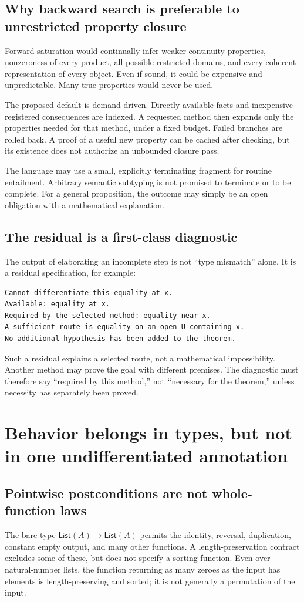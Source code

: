 \documentclass[11pt,a4paper]{article}
\theoremstyle{definition}
\begin{document}
\subsection{Why backward search is preferable to unrestricted property closure}
Forward saturation would continually infer weaker continuity properties,
nonzeroness of every product, all possible restricted domains, and every
coherent representation of every object. Even if sound, it could be expensive
and unpredictable. Many true properties would never be used.

The proposed default is demand-driven. Directly available facts and inexpensive
registered consequences are indexed. A requested method then expands only the
properties needed for that method, under a fixed budget. Failed branches are
rolled back. A proof of a useful new property can be cached after checking, but
its existence does not authorize an unbounded closure pass.

The language may use a small, explicitly terminating fragment for routine
entailment. Arbitrary semantic subtyping is not promised to terminate or to be
complete. For a general proposition, the outcome may simply be an open
obligation with a mathematical explanation.

\subsection{The residual is a first-class diagnostic}
The output of elaborating an incomplete step is not ``type mismatch'' alone.
It is a residual specification, for example:
\begin{lstlisting}
Cannot differentiate this equality at x.
Available: equality at x.
Required by the selected method: equality near x.
A sufficient route is equality on an open U containing x.
No additional hypothesis has been added to the theorem.
\end{lstlisting}

Such a residual explains a selected route, not a mathematical impossibility.
Another method may prove the goal with different premises. The diagnostic must
therefore say ``required by this method,'' not ``necessary for the theorem,''
unless necessity has separately been proved.

\section{Behavior belongs in types, but not in one undifferentiated annotation}\label{sec:behavior}
\subsection{Pointwise postconditions are not whole-function laws}
The bare type $\mathsf{List}(A)\to\mathsf{List}(A)$ permits the identity,
reversal, duplication, constant empty output, and many other functions. A
length-preservation contract excludes some of these, but does not specify a
sorting function. Even over natural-number lists, the function returning as
many zeroes as the input has elements is length-preserving and sorted; it is
not generally a permutation of the input.
\end{document}

